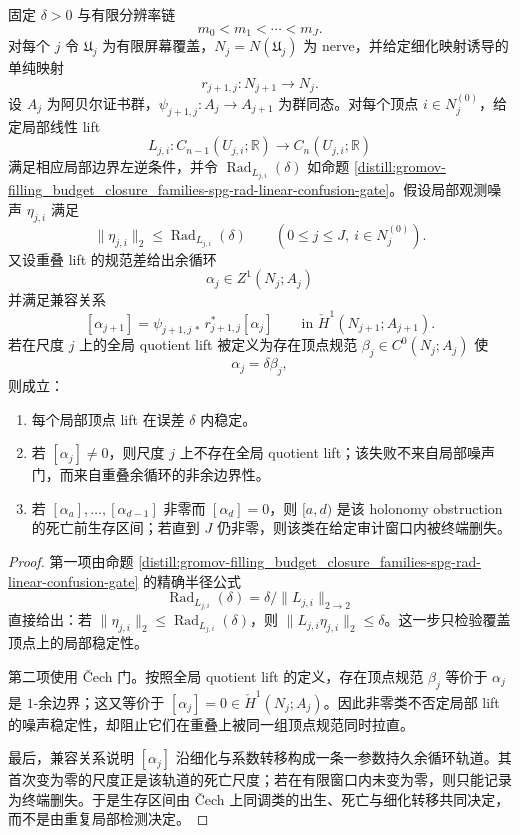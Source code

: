 \begin{theorem}\label{thm:distill-spg-noise-cech-refinement-persistence}
固定 \(\delta>0\) 与有限分辨率链
\[
m_0<m_1<\cdots<m_J .
\]
对每个 \(j\) 令 \(\mathfrak U_j\) 为有限屏幕覆盖，\(N_j=N(\mathfrak U_j)\) 为 nerve，并给定细化映射诱导的单纯映射
\[
r_{j+1,j}:N_{j+1}\longrightarrow N_j .
\]
设 \(A_j\) 为阿贝尔证书群，\(\psi_{j+1,j}:A_j\to A_{j+1}\) 为群同态。对每个顶点 \(i\in N_j^{(0)}\)，给定局部线性 lift
\[
L_{j,i}:C_{n-1}(U_{j,i};\mathbb R)\longrightarrow C_n(U_{j,i};\mathbb R)
\]
满足相应局部边界左逆条件，并令 \(\operatorname{Rad}_{L_{j,i}}(\delta)\) 如命题 \ref{distill:gromov-filling_budget_closure_families-spg-rad-linear-confusion-gate}。假设局部观测噪声 \(\eta_{j,i}\) 满足
\[
\|\eta_{j,i}\|_2\le \operatorname{Rad}_{L_{j,i}}(\delta)
\qquad(0\le j\le J,\ i\in N_j^{(0)}).
\]
又设重叠 lift 的规范差给出余循环
\[
\alpha_j\in Z^1(N_j;A_j)
\]
并满足兼容关系
\[
[\alpha_{j+1}]=\psi_{j+1,j\,*}\,r_{j+1,j}^{\ast}[\alpha_j]
\qquad\text{in }\check H^1(N_{j+1};A_{j+1}).
\]
若在尺度 \(j\) 上的全局 quotient lift 被定义为存在顶点规范 \(\beta_j\in C^0(N_j;A_j)\) 使
\[
\alpha_j=\delta\beta_j,
\]
则成立：
\begin{enumerate}
  \item 每个局部顶点 lift 在误差 \(\delta\) 内稳定。
  \item 若 \([\alpha_j]\ne0\)，则尺度 \(j\) 上不存在全局 quotient lift；该失败不来自局部噪声门，而来自重叠余循环的非余边界性。
  \item 若 \([\alpha_a],\ldots,[\alpha_{d-1}]\) 非零而 \([\alpha_d]=0\)，则 \([a,d)\) 是该 holonomy obstruction 的死亡前生存区间；若直到 \(J\) 仍非零，则该类在给定审计窗口内被终端删失。
\end{enumerate}
\end{theorem}
\begin{proof}
第一项由命题 \ref{distill:gromov-filling_budget_closure_families-spg-rad-linear-confusion-gate} 的精确半径公式
\[
\operatorname{Rad}_{L_{j,i}}(\delta)=\delta/\|L_{j,i}\|_{2\to2}
\]
直接给出：若 \(\|\eta_{j,i}\|_2\le\operatorname{Rad}_{L_{j,i}}(\delta)\)，则 \(\|L_{j,i}\eta_{j,i}\|_2\le\delta\)。这一步只检验覆盖顶点上的局部稳定性。

第二项使用 \v Cech 门。按照全局 quotient lift 的定义，存在顶点规范 \(\beta_j\) 等价于 \(\alpha_j\) 是 \(1\)-余边界；这又等价于 \([\alpha_j]=0\in\check H^1(N_j;A_j)\)。因此非零类不否定局部 lift 的噪声稳定性，却阻止它们在重叠上被同一组顶点规范同时拉直。

最后，兼容关系说明 \([\alpha_j]\) 沿细化与系数转移构成一条一参数持久余循环轨道。其首次变为零的尺度正是该轨道的死亡尺度；若在有限窗口内未变为零，则只能记录为终端删失。于是生存区间由 \v Cech 上同调类的出生、死亡与细化转移共同决定，而不是由重复局部检测决定。
\end{proof}

\endinput
